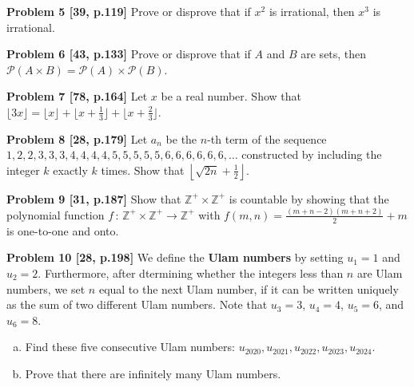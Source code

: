 \documentclass[jou]{apa6}
\begin{document}
\vspace{2ex}
{\bf Problem 5 [39, p.119]} 
Prove or disprove that if $x^2$ is irrational, then $x^3$ is irrational. 

\vspace{2ex}
{\bf Problem 6 [43, p.133]}
Prove or disprove that if $A$ and $B$ are sets, then 
$\mathcal{P}(A \times B) = \mathcal{P}(A) \times \mathcal{P}(B)$.

\vspace{2ex}
{\bf Problem 7 [78, p.164]}
Let $x$ be a real number. Show that 
$\lfloor 3x \rfloor = \lfloor x \rfloor + \lfloor x + \frac{1}{3} \rfloor +
\lfloor x + \frac{2}{3} \rfloor$.

\vspace{2ex}
{\bf Problem 8 [28, p.179]}
Let $a_n$ be the $n$-th term of the sequence $1, 2,2, 3,3,3, 4,4,4,4, 5,5,5,5,5, 6,6,6,6,6,6,\ldots$
constructed by including the integer $k$ exactly $k$ times. Show that 
${\displaystyle \left\lfloor \sqrt{2n} + \frac{1}{2} \right\rfloor}$. 


\vspace{2ex}
{\bf Problem 9 [31, p.187]}
Show that $\mathbb{Z}^{+} \times \mathbb{Z}^{+}$ is countable by showing that
the polynomial function $f\,:\,\mathbb{Z}^{+} \times \mathbb{Z}^{+} \rightarrow \mathbb{Z}^{+}$
with ${\displaystyle f(m,n) = \frac{(m+n-2)(m+n+2)}{2} + m}$ is one-to-one and onto.

\vspace{2ex}
{\bf Problem 10 [28, p.198]}
We define the {\bf Ulam numbers} by setting $u_1 = 1$ and $u_2 = 2$. 
Furthermore, after dtermining whether the integers less than $n$ are 
Ulam numbers, we set $n$ equal to the next Ulam number, if it can be written uniquely as the
sum of two different Ulam numbers. Note that $u_3 = 3$, $u_4 = 4$, 
$u_5 = 6$, and $u_6 = 8$. 
\begin{enumerate}[(a)]
\item Find these five consecutive Ulam numbers: $u_{2020},u_{2021},u_{2022},u_{2023},u_{2024}$. 
\item Prove that there are infinitely many Ulam numbers.
\end{enumerate}
\end{document}
